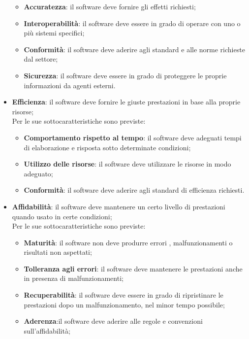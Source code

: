 \documentclass[../piano-di-qualifica.tex]{subfiles}
\begin{document}
\begin{itemize}
\begin{itemize}
            \item \textbf{Accuratezza}: il software deve fornire gli effetti richiesti;
            \item \textbf{Interoperabilità}: il software deve essere in grado di operare con uno o più sistemi specifici;
            \item \textbf{Conformità}: il software deve aderire agli standard e alle norme richieste dal settore;
            \item \textbf{Sicurezza}: il software deve essere in grado di proteggere le proprie informazioni da agenti esterni.
        \end{itemize}
        \item \textbf{Efficienza}: il software deve fornire le giuste prestazioni in base alla proprie risorse;
        \\Per le sue sottocaratteristiche sono previste:
        \begin{itemize}
            \item \textbf{Comportamento rispetto al tempo}: il software deve adeguati tempi di elaborazione e risposta sotto determinate condizioni;
            \item \textbf{Utilizzo delle risorse}: il software deve utilizzare le risorse in modo adeguato;
            \item \textbf{Conformità}: il software deve aderire agli standard di efficienza richiesti.
        \end{itemize}
        \item \textbf{Affidabilità}: il software deve mantenere un certo livello di prestazioni quando usato in certe condizioni;
        \\Per le sue sottocaratteristiche sono previste:
        \begin{itemize}
            \item \textbf{Maturità}: il software non deve produrre errori , malfunzionamenti o risultati non aspettati;
            \item \textbf{Tolleranza agli errori}: il software deve mantenere le prestazioni anche in presenza di malfunzionamenti;
            \item \textbf{Recuperabilità}: il software deve essere in grado di ripristinare le prestazioni dopo un malfunzionamento, nel minor tempo possibile;
            \item \textbf{Aderenza}:il software deve aderire alle regole e convenzioni sull'affidabilità;
        \end{itemize}

\end{itemize}
\end{document}
